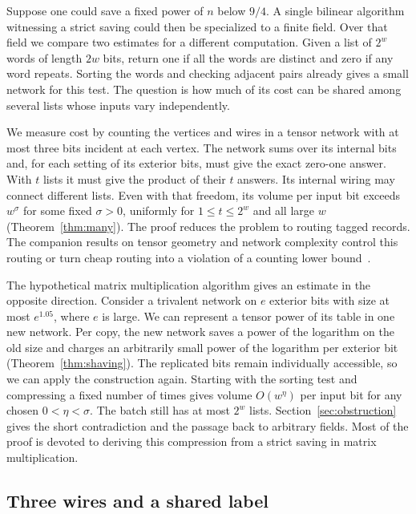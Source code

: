 Suppose one could save a fixed power of \(n\) below \(9/4\). A single
bilinear algorithm witnessing a strict saving could then be specialized
to a finite field. Over that field we compare two estimates for a
different computation. Given a list of \(2^w\) words of length \(2w\)
bits, return one if all the words are distinct and zero if any word repeats. Sorting the words and
checking adjacent pairs already gives a small network for this test.
The question is how much of its cost can be shared among several lists
whose inputs vary independently.

We measure cost by counting the vertices and wires in a tensor network
with at most three bits incident at each vertex. The network sums over
its internal bits and, for each setting of its exterior bits, must give
the exact zero-one answer. With \(t\) lists it must give the product of
their \(t\) answers. Its internal wiring may connect different lists.
Even with that freedom, its volume per input bit exceeds \(w^\sigma\)
for some fixed \(\sigma>0\), uniformly for \(1\le t\le2^w\) and all
large \(w\) (Theorem~\ref{thm:many}). The proof reduces the problem to
routing tagged records. The companion results on tensor geometry and
network complexity control this routing or turn cheap routing into a
violation of a counting lower bound~\cite{oaG,oaP}.

The hypothetical matrix multiplication algorithm gives an estimate in
the opposite direction. Consider a trivalent network on \(e\) exterior bits with size at most
\(e^{1.05}\), where \(e\) is large. We can represent a tensor power of
its table in one new network. Per copy, the new network saves a power of the logarithm on
the old size and charges an arbitrarily small power of the logarithm
per exterior bit (Theorem~\ref{thm:shaving}). The replicated bits remain
individually accessible, so we can apply the construction again. Starting
with the sorting test and compressing a fixed number of times gives
volume \(O(w^\eta)\) per input bit for any chosen \(0<\eta<\sigma\).
The batch still has at most \(2^w\) lists. Section~\ref{sec:obstruction}
gives the short contradiction and the passage back to arbitrary fields.
Most of the proof is devoted to deriving this compression from a strict
saving in matrix multiplication.

\subsection{Three wires and a shared label}

